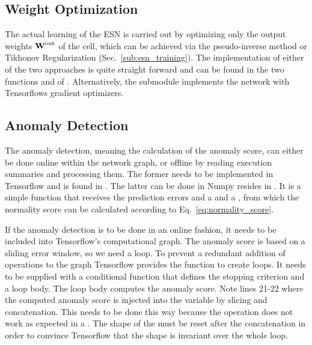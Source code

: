 \subsection{Weight Optimization}%
\label{sec:weight_optimization}

The actual learning of the ESN is carried out by optimizing only the output
weights $\boldsymbol{\textbf{W}}^{\text{out}}$ of the cell, which can be achieved via the pseudo-inverse
method or Tikhonov Regularization (Sec.~\ref{sub:esn_training}). The
implementation of either of the two approaches is quite straight forward
and can be found in the two functions  and 
of .
Alternatively, the  submodule implements the network
with Tensorflows gradient optimizers.\\

\subsection{Anomaly Detection}%
\label{sec:anomaly_detection_model}

The anomaly detection, meaning the calculation of the anomaly score, can either
be done online within the network graph, or offline by reading execution
summaries and processing them. The former needs to be implemented in Tensorflow
and is found in . The latter can be done in Numpy
resides in .  It is a simple function that receives
the prediction errors and a  and a
, from which the normality score can be calculated
according to Eq.~\ref{eq:normality_score}.

If the anomaly detection is to be done in an online fashion, it needs to be
included into Tensorflow's computational graph.  The anomaly score is based on
a sliding error window, so we need a loop. To prevent a redundant addition of
operations to the graph Tensorflow provides the  function
to create loops. It needs to be supplied with a conditional function that
defines the stopping criterion and a loop body.  The loop body computes the
anomaly score. Note lines 21-22 where the computed anomaly score is injected
into the  variable by slicing and concatenation. This needs to be
done this way because the  operation does not work as expected
in a .  The shape of the  must be reset after
the concatenation in order to convince Tensorflow that the shape is invariant
over the whole loop.

